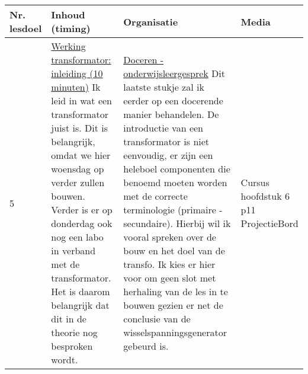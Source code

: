 \begin{landscape}
\begin{tabularx}{1.56\textwidth}{|p{1.5cm}|p{8cm}|X|p{4cm}|}
	\hline
	\textbf{Nr. lesdoel } & \textbf{Inhoud (timing)}  & \textbf{Organisatie } & \textbf{Media } \\ \hline
	5& \underline{Werking transformator:} \underline{inleiding (10 minuten)}\newline
	 Ik leid in wat een transformator juist is. Dit is belangrijk, omdat we hier woensdag op verder zullen bouwen. Verder is er op donderdag ook nog een labo in verband met de transformator. Het is daarom belangrijk dat dit in de theorie nog besproken wordt.
	&  \underline{Doceren - onderwijsleergesprek}\newline 
	Dit laatste stukje zal ik eerder op een docerende manier behandelen. De introductie van een transformator is niet eenvoudig, er zijn een heleboel componenten die benoemd moeten worden met de correcte terminologie (primaire - secundaire). Hierbij wil ik vooral spreken over de bouw en het doel van de transfo. Ik kies er hier voor om geen slot met herhaling van de les in te bouwen gezien er net de conclusie van de wisselspanningsgenerator gebeurd is. 	
	&  Cursus hoofdstuk 6 p11 \newline\newline Projectie\newline\newline Bord
	\\ \hline
\end{tabularx}\vspace{5mm}




	
\end{landscape}



%
%
%
%
%
%
%
%
%
%